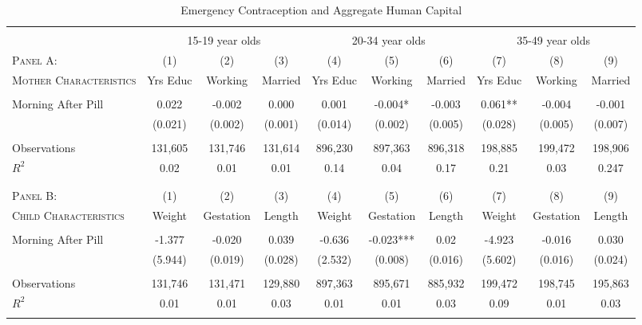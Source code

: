 \begin{landscape}\begin{table}[htpb!]\centering
\caption{Emergency Contraception and Aggregate Human Capital} \label{TEENtab:PillAgg}
\begin{tabular}{@{\extracolsep{5pt}}lccccccccc} \\
[-1.8ex]\hline\hline \\[-1.8ex] &\multicolumn{3}{c}{15-19 year olds} &\multicolumn{3}{c}{20-34 year olds} &\multicolumn{3}{c}{35-49 year olds} \\
\cmidrule(r){2-4} \cmidrule(r){5-7} \cmidrule(r){8-10}
\textsc{Panel A:}&(1)&(2)&(3)&(4)&(5)&(6)&(7)&(8)&(9) \\
\textsc{Mother Characteristics} & Yrs Educ & Working & Married& Yrs Educ & Working & Married & Yrs Educ & Working & Married\\ \midrule
 & & & & & & & & & \\
Morning After Pill & 0.022 & -0.002 & 0.000& 0.001 & -0.004* & -0.003& 0.061** & -0.004 & -0.001 \\
& (0.021) & (0.002) & (0.001)& (0.014) & (0.002) & (0.005)& (0.028) & (0.005) & (0.007) \\
 & & & & & & & & & \\
Observations & 131,605 & 131,746 & 131,614& 896,230 & 897,363 & 896,318& 198,885 & 199,472 & 198,906\\
$ R^2 $ &  0.02 & 0.01 & 0.01& 0.14 & 0.04 & 0.17& 0.21 & 0.03 & 0.247 \\
 & & & & & & & & & \\
 & & & & & & & & & \\ \midrule
\textsc{Panel B:}&(1)&(2)&(3)&(4)&(5)&(6)&(7)&(8)&(9) \\
\textsc{Child Characteristics} & Weight & Gestation & Length& Weight & Gestation & Length & Weight & Gestation & Length\\ \midrule
 & & & & & & & & & \\
Morning After Pill & -1.377 & -0.020 & 0.039& -0.636 & -0.023*** & 0.02& -4.923 & -0.016 & 0.030 \\
& (5.944) & (0.019) & (0.028)& (2.532) & (0.008) & (0.016)& (5.602) & (0.016) & (0.024) \\
 & & & & & & & & & \\
Observations & 131,746 & 131,471 & 129,880& 897,363 & 895,671 & 885,932& 199,472 & 198,745 & 195,863\\
$ R^2 $ & 0.01 & 0.01 & 0.03& 0.01 & 0.01 & 0.03& 0.09 & 0.01 & 0.03 \\ \hline \hline \\[-1.8ex]

\end{tabular}
\end{table}
\end{landscape}
